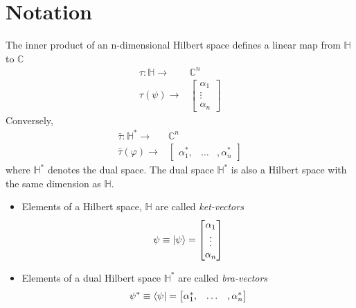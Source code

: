 \section{Notation}
\begin{definition}
The inner product of an n-dimensional Hilbert space defines a linear map from $\mathbb{H}$ to $\mathbb{C}$
\begin{align*}
  \tau: \mathbb{H}\longrightarrow& \mathbb{C}^{n} \\
  \tau(\psi) \longrightarrow& \begin{bmatrix}
           \alpha_{1} \\
           \vdots \\
           \alpha_{n}
         \end{bmatrix}
\end{align*}  
Conversely, 
\begin{align*}
  \bar{\tau}: \mathbb{H}^{*}\longrightarrow& \mathbb{C}^{n} \\
  \bar{\tau}(\varphi) \longrightarrow& \begin{bmatrix}
           \alpha_{1}^{*}, & \hdots &, \alpha_{n}^{*}
         \end{bmatrix}
\end{align*}  
where $\mathbb{H}^{*}$ denotes the dual space. The dual space $\mathbb{H}^{*}$ is also a Hilbert space with the same dimension as $\mathbb{H}$. \\
\begin{itemize}
    \item Elements of a Hilbert space, $\mathbb{H}$ are called \textit{ket-vectors} 
\begin{equation}
    \psi \equiv \ket{\psi} =  \begin{bmatrix}
           \alpha_{1} \\
           \vdots \\
           \alpha_{n}
         \end{bmatrix}
\end{equation}
\item Elements of a dual Hilbert space $\mathbb{H}^{*}$ are called \textit{bra-vectors}
\begin{equation}
    \psi^{*} \equiv \bra{\psi} =  \begin{bmatrix}
           \alpha_{1}^{*}, & \hdots &, \alpha_{n}^{*}
         \end{bmatrix}
\end{equation}
\end{itemize}
\end{definition}
